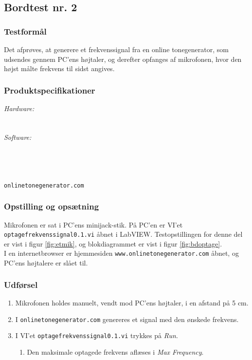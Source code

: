 	\subsection{Bordtest nr. 2} %
		\subsubsection{Testformål}
		Det afprøves, at generere et frekvenssignal fra en online tonegenerator, som udsendes gennem PC'ens højtaler, og derefter opfanges af mikrofonen, hvor den højst målte frekvens til sidst angives.  
		
		\subsubsection{Produktspecifikationer}
		
		\textit{Hardware:}\\
		\mikrofon\\
		\PC\\
	
		\textit{Software:}\\
		\labview\\
		\visa\\
		\vi\\
		\ardsw\\
		\texttt{onlinetonegenerator.com}
		
		\subsubsection{Opstilling og opsætning}
		Mikrofonen er sat i PC'ens minijack-stik. På PC'en er VI'et \texttt{optagefrekvenssignal0.1.vi} åbnet i LabVIEW. Testopstillingen for denne del er vist i figur \ref{fig:etmik}, og blokdiagrammet er vist i figur \ref{fig:bdoptage}.\\ 
		I en internetbrowser er hjemmesiden \texttt{www.onlinetonegenerator.com} åbnet, og PC'ens højtalere er slået til. 
		
		\subsubsection{Udførsel}
			\begin{enumerate}
				\item Mikrofonen holdes manuelt, vendt mod PC'ens højtaler, i en afstand på 5 cm. 
				\item I \texttt{onlinetonegenerator.com} genereres et signal med den ønskede frekvens. 
				\item I VI'et \texttt{optagefrekvenssignal0.1.vi} trykkes på \textit{Run}. 
					\begin{enumerate}
						\item Den maksimale optagede frekvens aflæses i \textit{Max Frequency}. 
					\end{enumerate}	  
			\end{enumerate}
			
